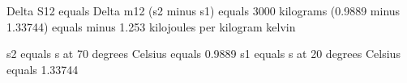 Delta S12 equals Delta m12 (s2 minus s1)  
equals 3000 kilograms (0.9889 minus 1.33744) equals minus 1.253 kilojoules per kilogram kelvin  

s2 equals s at 70 degrees Celsius equals 0.9889  
s1 equals s at 20 degrees Celsius equals 1.33744